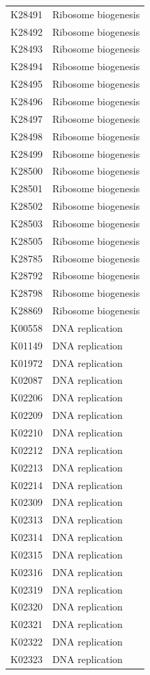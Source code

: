 \begin{longtable}{@{}l l@{}}
K28491 & Ribosome biogenesis \\
K28492 & Ribosome biogenesis \\
K28493 & Ribosome biogenesis \\
K28494 & Ribosome biogenesis \\
K28495 & Ribosome biogenesis \\
K28496 & Ribosome biogenesis \\
K28497 & Ribosome biogenesis \\
K28498 & Ribosome biogenesis \\
K28499 & Ribosome biogenesis \\
K28500 & Ribosome biogenesis \\
K28501 & Ribosome biogenesis \\
K28502 & Ribosome biogenesis \\
K28503 & Ribosome biogenesis \\
K28505 & Ribosome biogenesis \\
K28785 & Ribosome biogenesis \\
K28792 & Ribosome biogenesis \\
K28798 & Ribosome biogenesis \\
K28869 & Ribosome biogenesis \\
K00558 & DNA replication \\
K01149 & DNA replication \\
K01972 & DNA replication \\
K02087 & DNA replication \\
K02206 & DNA replication \\
K02209 & DNA replication \\
K02210 & DNA replication \\
K02212 & DNA replication \\
K02213 & DNA replication \\
K02214 & DNA replication \\
K02309 & DNA replication \\
K02313 & DNA replication \\
K02314 & DNA replication \\
K02315 & DNA replication \\
K02316 & DNA replication \\
K02319 & DNA replication \\
K02320 & DNA replication \\
K02321 & DNA replication \\
K02322 & DNA replication \\
K02323 & DNA replication \\

\end{longtable}
